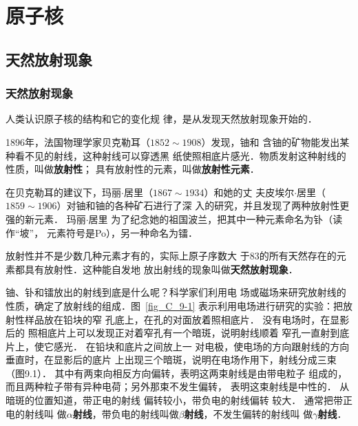 \chapter{原子核}\label{chapter-atomic-nucleus}

\section{天然放射现象}

\subsection{天然放射现象}

人类认识原子核的结构和它的变化规
律，是从发现天然放射现象开始的．

1896年，法国物理学家贝克勒耳（$1852 \sim 1908$）发现，铀和
含铀的矿物能发出某种看不见的射线，这种射线可以穿透黑
纸使照相底片感光．物质发射这种射线的性质，叫做\textbf{放射性}；
具有放射性的元素，叫做\textbf{放射性元素}．

在贝克勒耳的建议下，玛丽$\cdot$居里（$1867 \sim 1934$）和她的丈
夫皮埃尔$\cdot$居里（$1859 \sim 1906$）对铀和铀的各种矿石进行了深
入的研究，并且发现了两种放射性更强的新元素．
玛丽$\cdot$居里
为了纪念她的祖国波兰，把其中一种元素命名为钋（读作“坡”，
元素符号是Po），另一种命名为镭．

放射性并不是少数几种元素才有的，实际上原子序数大
于83的所有天然存在的元素都具有放射性．这种能自发地
放出射线的现象叫做\textbf{天然放射现象}．

铀、钋和镭放出的射线到底是什么呢？科学家们利用电
场或磁场来研究放射线的性质，确定了放射线的组成．图~\ref{fig_C_9-1} 
表示利用电场进行研究的实验：把放射性样品放在铅块的窄
孔底上，在孔的对面放着照相底片．
没有电场时，在显影后的
照相底片上可以发现正对着窄孔有一个暗斑，说明射线顺着
窄孔一直射到底片上，使它感光．
在铅块和底片之间放上一
对电极，使电场的方向跟射线的方向垂直时，在显影后的底片
上出现三个暗斑，说明在电场作用下，射线分成三束（图9.1）．
其中有两束向相反方向偏转，表明这两束射线是由带电粒子
组成的，而且两种粒子带有异种电荷；另外那束不发生偏转，
表明这束射线是中性的．
从暗斑的位置知道，带正电的射线
偏转较小，带负电的射线偏转
较大．
通常把带正电的射线叫
做\textbf{$\alpha$射线}，带负电的射线叫做\textbf{$\beta$射线}，不发生偏转的射线叫
做\textbf{$\gamma$射线}．

